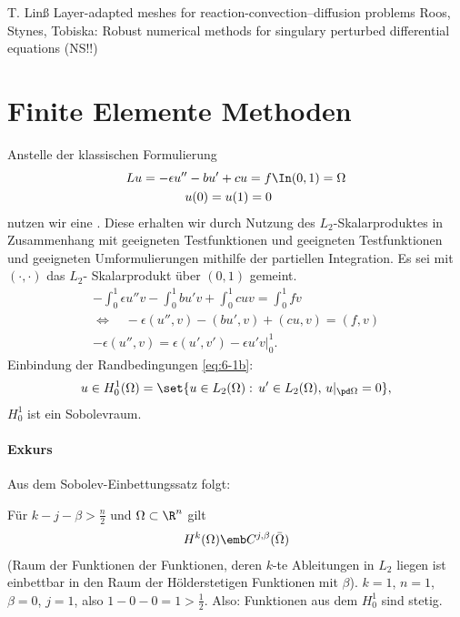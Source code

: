 
T. Linß Layer-adapted meshes for reaction-convection--diffusion problems
Roos, Stynes, Tobiska: Robust numerical methods for singulary perturbed differential equations (NS!!)

\section{Finite Elemente Methoden}
\label{sec:finite-elem-meth}

Anstelle der klassischen Formulierung
\begin{subequations}
  \label{eq:6-1}
  \begin{align}
    Lu = - \epsilon u'' - b u' + cu = f &\In (0, 1) = \Omega \label{eq:6-1a}\\
    u(0) = u(1) = 0 & \label{eq:6-1b}
  \end{align}
\end{subequations}
nutzen wir eine . Diese erhalten wir durch Nutzung des $L_{2}$-Skalarproduktes in Zusammenhang mit geeigneten Testfunktionen und geeigneten Testfunktionen und geeigneten Umformulierungen mithilfe der partiellen Integration. Es sei mit $(\cdot, \cdot)$ das $L_{2}$- Skalarprodukt über $(0, 1)$ gemeint. 
\begin{align*}
  - \int_{0}^{1} \epsilon u'' v - \int_{0}^{1} b u' v + \int_{0}^{1} cuv = \int_{0}^{1} fv\\
  \iff \quad - \epsilon (u'', v) - (bu', v) + (cu, v) = (f, v) \\
  - \epsilon (u'', v) = \epsilon (u', v') - \epsilon u'v|_{0}^{1}. 
\end{align*}
Einbindung der Randbedingungen \eqref{eq:6-1b}:
\begin{align*}
  u \in H_{0}^{1}(\Omega) = \set{u \in L_{2}(\Omega): \, u'\in L_{2}(\Omega), \, u|_{\pd \Omega} = 0},  
\end{align*}
$H_{0}^{1}$ ist ein Sobolevraum.

\paragraph{Exkurs}
Aus dem Sobolev-Einbettungssatz folgt: 

Für $k-j-\beta > \frac n2$ und $\Omega \subset \R^{n}$ gilt
\begin{align*}
  H^{k}(\Omega) \emb C^{j, \beta}(\bar \Omega)
\end{align*}
(Raum der Funktionen der Funktionen, deren $k$-te Ableitungen in $L_{2}$ liegen ist einbettbar in den Raum der Hölderstetigen Funktionen mit $\beta$). $k =1$, $n = 1$, $\beta = 0$, $j = 1$, also $1 - 0- 0 = 1 > \frac 12$. 
Also: Funktionen aus dem $H_{0}^{1}$ sind stetig. 

